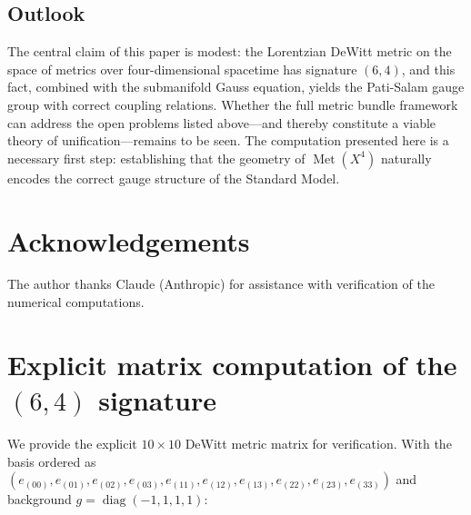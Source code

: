 \documentclass[12pt,a4paper]{article}
\theoremstyle{definition}
\newcommand{\Met}{\operatorname{Met}}
\newcommand{\diag}{\operatorname{diag}}
\begin{document}
\subsection{Outlook}

The central claim of this paper is modest: the Lorentzian DeWitt metric on the space of metrics over four-dimensional spacetime has signature $(6,4)$, and this fact, combined with the submanifold Gauss equation, yields the Pati-Salam gauge group with correct coupling relations.
Whether the full metric bundle framework can address the open problems listed above---and thereby constitute a viable theory of unification---remains to be seen.
The computation presented here is a necessary first step: establishing that the geometry of $\Met(X^4)$ naturally encodes the correct gauge structure of the Standard Model.



\section*{Acknowledgements}

The author thanks Claude (Anthropic) for assistance with verification of the numerical computations.






\appendix

\section{Explicit matrix computation of the \texorpdfstring{$(6,4)$}{(6,4)} signature}
\label{app:matrix}

We provide the explicit $10 \times 10$ DeWitt metric matrix for verification.
With the basis ordered as $(e_{(00)}, e_{(01)}, e_{(02)}, e_{(03)}, e_{(11)}, e_{(12)}, e_{(13)}, e_{(22)}, e_{(23)}, e_{(33)})$ and background $g = \diag(-1,1,1,1)$:
\end{document}
